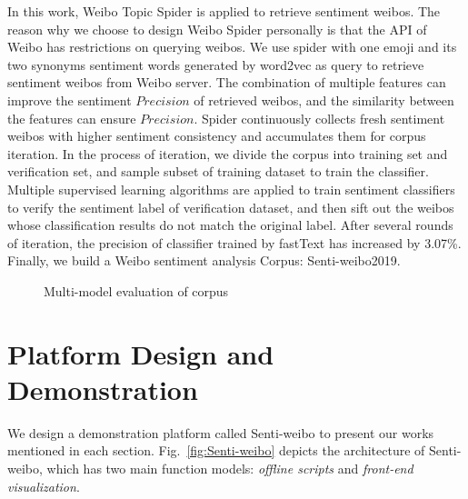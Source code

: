 \documentclass[runningheads]{llncs}
\begin{document}
In this work, Weibo Topic Spider is applied to retrieve sentiment weibos. The reason why we choose to design Weibo Spider personally is that the API of Weibo has restrictions on querying weibos. We use spider with one emoji and its two synonyms sentiment words generated by word2vec as query to retrieve sentiment weibos from Weibo server. The combination of multiple features can improve the sentiment $Precision$ of retrieved weibos, and the similarity between the features can ensure $Precision$. Spider continuously collects fresh sentiment weibos with higher sentiment consistency and accumulates them for corpus iteration. In the process of iteration, we divide the corpus into training set and verification set, and sample subset of training dataset to train the classifier. Multiple supervised learning algorithms are applied to train sentiment classifiers to verify the sentiment label of verification dataset, and then sift out the weibos whose classification results do not match the original label. After several rounds of iteration, the precision of classifier trained by fastText has increased by 3.07\%. Finally, we build a Weibo sentiment analysis Corpus: Senti-weibo2019. 

\begin{figure}[ht]
\vspace{-0.5cm}   %
\centering
{}
\caption{Multi-model evaluation of corpus}
\label{fig:corpus-evaluation}
\end{figure}

\section{Platform Design and Demonstration}
We design a demonstration platform called Senti-weibo to present our works mentioned in each section. Fig.~\ref{fig:Senti-weibo} depicts the architecture of Senti-weibo, which has two main function models: \textit{offline scripts} and \textit{front-end visualization}.
\end{document}
